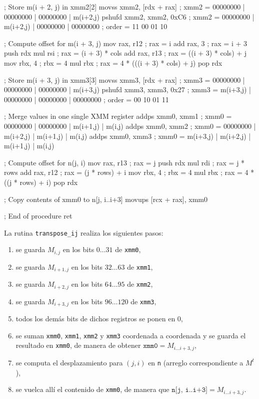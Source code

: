 \documentclass[a4paper, 10pt, twoside]{article}
\newcommand{\cc}[1]{\texttt{#1}}
\begin{document}
\begin{code}
    ; Store m(i + 2, j) in xmm2[2]
    movss xmm2, [rdx + rax]  ; xmm2 = 00000000 | 00000000 | 00000000 | m(i+2,j)
    pshufd xmm2, xmm2, 0xC6  ; xmm2 = 00000000 | m(i+2,j) | 00000000 | 00000000
                             ; order = 11 00 01 10

    ; Compute offset for m(i + 3, j)
    mov rax, r12             ; rax = i
    add rax, 3               ; rax = i + 3
    push rdx
    mul rsi                  ; rax = (i + 3) * cols
    add rax, r13             ; rax = ((i + 3) * cols) + j
    mov rbx, 4               ; rbx = 4
    mul rbx                  ; rax = 4 * (((i + 3) * cols) + j)
    pop rdx

    ; Store m(i + 3, j) in xmm3[3]
    movss xmm3, [rdx + rax]  ; xmm3 = 00000000 | 00000000 | 00000000 | m(i+3,j)
    pshufd xmm3, xmm3, 0x27  ; xmm3 = m(i+3,j) | 00000000 | 00000000 | 00000000
                             ; order = 00 10 01 11

    ; Merge values in one single XMM register
    addps xmm0, xmm1         ; xmm0 = 00000000 | 00000000 | m(i+1,j) |   m(i,j)
    addps xmm0, xmm2         ; xmm0 = 00000000 | m(i+2,j) | m(i+1,j) |   m(i,j)
    addps xmm0, xmm3         ; xmm0 = m(i+3,j) | m(i+2,j) | m(i+1,j) |   m(i,j)

    ; Compute offset for n(j, i)
    mov rax, r13             ; rax = j
    push rdx
    mul rdi                  ; rax = j * rows
    add rax, r12             ; rax = (j * rows) + i
    mov rbx, 4               ; rbx = 4
    mul rbx                  ; rax = 4 * ((j * rows) + i)
    pop rdx

    ; Copy contents of xmm0 to n[j, i..i+3]
    movups [rcx + rax], xmm0

    ; End of procedure
    ret
\end{code}

La rutina \cc{transpose\_ij} realiza los siguientes pasos:

\begin{enumerate}
  \item se guarda $M_{i,j}$ en los bits $0 \dots 31$ de \cc{xmm0},
  \item se guarda $M_{i+1,j}$ en los bits $32 \dots 63$ de \cc{xmm1},
  \item se guarda $M_{i+2,j}$ en los bits $64 \dots 95$ de \cc{xmm2},
  \item se guarda $M_{i+3,j}$ en los bits $96 \dots 120$ de \cc{xmm3},
  \item todos los demás bits de dichos registros se ponen en $0$,
  \item se suman \cc{xmm0}, \cc{xmm1}, \cc{xmm2} y \cc{xmm3} coordenada a
    coordenada y se guarda el resultado en \cc{xmm0}, de manera de obtener
    $\cc{xmm0} = M_{i \ldots i+3,j}$,
  \item se computa el desplazamiento para $(j,i)$ en \cc{n} (arreglo
    correspondiente a $M^t$),
  \item se vuelca allí el contenido de \cc{xmm0}, de manera que $\cc{n[j,
    i..i+3]} = M_{i \ldots i+3,j}$.
\end{enumerate}
\end{document}
